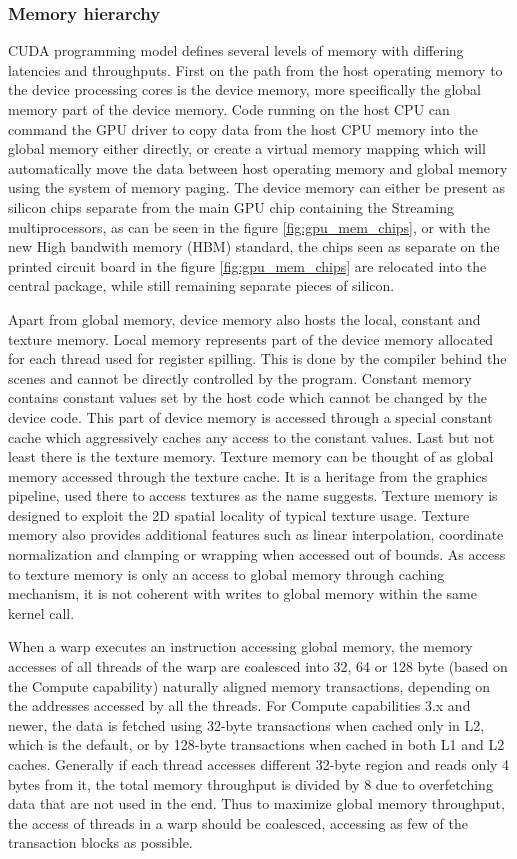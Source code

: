 \subsubsection{Memory hierarchy}
\label{sec:memory_hierarchy}
CUDA programming model defines several levels of memory with differing latencies and throughputs. First on the path from the host operating memory to the device processing cores is the device memory, more specifically the global memory part of the device memory. Code running on the host CPU can command the GPU driver to copy data from the host CPU memory into the global memory either directly, or create a virtual memory mapping which will automatically move the data between host operating memory and global memory using the system of memory paging. The device memory can either be present as silicon chips separate from the main GPU chip containing the Streaming multiprocessors, as can be seen in the figure \ref{fig:gpu_mem_chips}, or with the new High bandwith memory (HBM) standard, the chips seen as separate on the printed circuit board in the figure \ref{fig:gpu_mem_chips} are relocated into the central package, while still remaining separate pieces of silicon.

Apart from global memory, device memory also hosts the local, constant and texture memory. Local memory represents part of the device memory allocated for each thread used for register spilling. This is done by the compiler behind the scenes and cannot be directly controlled by the program. Constant memory contains constant values set by the host code which cannot be changed by the device code. This part of device memory is accessed through a special constant cache which aggressively caches any access to the constant values.  Last but not least there is the texture memory. Texture memory can be thought of as global memory accessed through the texture cache. It is a heritage from the graphics pipeline, used there to access textures as the name suggests. Texture memory is designed to exploit the 2D spatial locality of typical texture usage. Texture memory also provides additional features such as linear interpolation, coordinate normalization and clamping or wrapping when accessed out of bounds. As access to texture memory is only an access to global memory through caching mechanism, it is not coherent with writes to global memory within the same kernel call.




When a warp executes an instruction accessing global memory, the memory accesses of all threads of the warp are coalesced into 32, 64 or 128 byte (based on the Compute capability) naturally aligned memory transactions, depending on the addresses accessed by all the threads. For Compute capabilities 3.x and newer, the data is fetched using 32-byte transactions when cached only in L2, which is the default, or by 128-byte transactions when cached in both L1 and L2 caches. Generally if each thread accesses different 32-byte region and reads only 4 bytes from it, the total memory throughput is divided by 8 due to overfetching data that are not used in the end. Thus to maximize global memory throughput, the access of threads in a warp should be coalesced, accessing as few of the transaction blocks as possible. 

